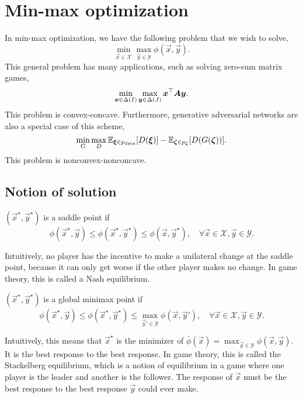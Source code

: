 \section{Min-max optimization}

In min-max optimization, we have the following problem that we wish to solve, \[
    \min_{\vec{x} \in \mathcal{X}} \max_{\vec{y} \in \mathcal{Y}} \phi(\vec{x}, \vec{y}).
\]
This general problem has many applications, such as solving zero-sum matrix games, \[
    \min_{\bm{x} \in \Delta(I)} \max_{\bm{y} \in \Delta(J)} \bm{x}^\top \bm{A} \bm{y}.
\]
This problem is convex-concave. Furthermore, generative adversarial networks are also a special
case of this scheme, \[
    \min_{G} \max_{D} \mathbb{E}_{\bm{\xi} \in p_{\mathrm{data}}} [D(\bm{\xi})] - \mathbb{E}_{\bm{\zeta} \in p_{\bm{\zeta}}} [D(G(\bm{\zeta}))].
\]
This problem is nonconvex-nonconcave.

\subsection{Notion of solution}

\begin{definition}
    $(\vec{x}^\star, \vec{y}^\star)$ is a saddle point if \[
        \phi(\vec{x}^\star, \vec{y}) \leq \phi(\vec{x}^\star, \vec{y}^\star) \leq \phi(\vec{x}, \vec{y}^\star), \quad \forall \vec{x} \in \mathcal{X}, \vec{y} \in \mathcal{Y}.
    \]
\end{definition}

Intuitively, no player has the incentive to make a unilateral change at the saddle point, because
it can only get worse if the other player makes no change. In game theory, this is called a Nash
equilibrium.

\begin{definition}
    $(\vec{x}^\star, \vec{y}^\star)$ is a global minimax point if \[
        \phi(\vec{x}^\star, \vec{y}) \leq \phi(\vec{x}^\star, \vec{y}^\star) \leq \max_{\vec{y}' \in \mathcal{Y}} \phi(\vec{x}, \vec{y}'), \quad \forall \vec{x} \in \mathcal{X}, \vec{y} \in \mathcal{Y}.
    \]
\end{definition}

Intuitively, this means that $\vec{x}^\star$ is the minimizer of $\bar{\phi}(\vec{x}) =
    \max_{\vec{y} \in \mathcal{Y}} \phi(\vec{x}, \vec{y})$. It is the best response to the best
response. In game theory, this is called the Stackelberg equilibrium, which is a notion of
equilibrium in a game where one player is the leader and another is the follower. The response of
$\vec{x}$ must be the best response to the best response $\vec{y}$ could ever make.

